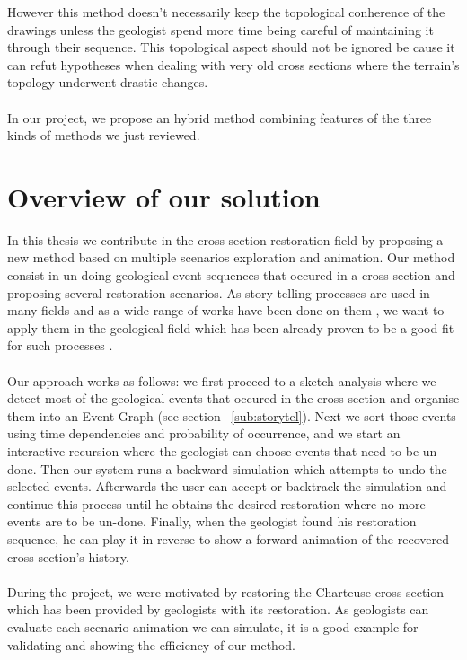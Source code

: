 \documentclass[12pt, a4paper]{report} %
\begin{document}
However this method doesn't necessarily keep the topological conherence of the drawings unless the geologist spend more time being careful of maintaining it through their sequence. This topological aspect should not be ignored be cause it can refut hypotheses when dealing with very old cross sections where the terrain's topology underwent drastic changes.\\\\
In our project, we propose an hybrid method combining features of the three kinds of methods we just reviewed.
\chapter{Overview of our solution}
\label{overview}
In this thesis we contribute in the cross-section restoration field by proposing a new method based on multiple scenarios exploration and animation. Our method consist in un-doing geological event sequences that occured in a cross section and proposing several restoration scenarios. As story telling processes are used in many fields and as a wide range of works have been done on them \cite{young}, we want to apply them in the geological field which has been already proven to be a good fit for such processes \cite{lidal}.\\\\
Our approach works as follows: we first proceed to a sketch analysis where we detect most of the geological events that occured in the cross section and organise them into an Event Graph (see section ~\ref{sub:storytel}).
Next we sort those events using time dependencies and probability of occurrence, and we start an interactive recursion where the geologist can choose events that need to be un-done. Then our system runs a backward simulation which attempts to undo the selected events. Afterwards the user can accept or backtrack the simulation and continue this process until he obtains the desired restoration where no more events are to be un-done.
Finally, when the geologist found his restoration sequence, he can play it in reverse to show a forward animation of the recovered cross section's history.\\\\
During the project, we were motivated by restoring the Charteuse cross-section which has been provided by geologists with its restoration. As geologists can evaluate each scenario animation we can simulate, it is a good example for validating and showing the efficiency of our method.\\\\
\end{document}

